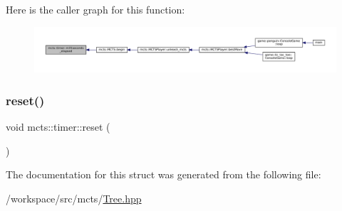 Here is the caller graph for this function\+:
\nopagebreak
\begin{figure}[H]
\begin{center}
\leavevmode
\includegraphics[width=350pt]{structmcts_1_1timer_af6b8b0201318b987bcab531de4b964f9_icgraph}
\end{center}
\end{figure}
\mbox{\label{structmcts_1_1timer_aebb46d1b1815b2d2bd17ae3acbf2b395}} 
\subsubsection{\texorpdfstring{reset()}{reset()}}
{\footnotesize\ttfamily void mcts\+::timer\+::reset (\begin{DoxyParamCaption}{ }\end{DoxyParamCaption})\hspace{0.3cm}{\ttfamily [inline]}}



The documentation for this struct was generated from the following file\+:\begin{DoxyCompactItemize}
\item 
/workspace/src/mcts/\hyperlink{_tree_8hpp}{Tree.\+hpp}\end{DoxyCompactItemize}
